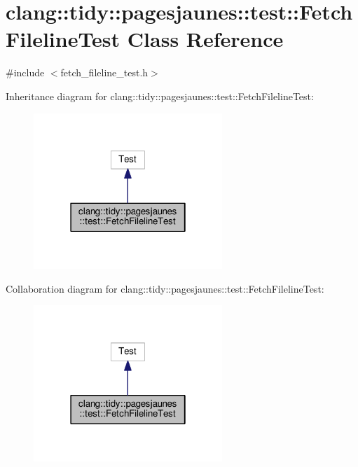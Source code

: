 \hypertarget{classclang_1_1tidy_1_1pagesjaunes_1_1test_1_1_fetch_fileline_test}{}\section{clang\+:\+:tidy\+:\+:pagesjaunes\+:\+:test\+:\+:Fetch\+Fileline\+Test Class Reference}
\label{classclang_1_1tidy_1_1pagesjaunes_1_1test_1_1_fetch_fileline_test}


{\ttfamily \#include $<$fetch\+\_\+fileline\+\_\+test.\+h$>$}



Inheritance diagram for clang\+:\+:tidy\+:\+:pagesjaunes\+:\+:test\+:\+:Fetch\+Fileline\+Test\+:
\nopagebreak
\begin{figure}[H]
\begin{center}
\leavevmode
\includegraphics[width=202pt]{classclang_1_1tidy_1_1pagesjaunes_1_1test_1_1_fetch_fileline_test__inherit__graph}
\end{center}
\end{figure}


Collaboration diagram for clang\+:\+:tidy\+:\+:pagesjaunes\+:\+:test\+:\+:Fetch\+Fileline\+Test\+:
\nopagebreak
\begin{figure}[H]
\begin{center}
\leavevmode
\includegraphics[width=202pt]{classclang_1_1tidy_1_1pagesjaunes_1_1test_1_1_fetch_fileline_test__coll__graph}
\end{center}
\end{figure}
